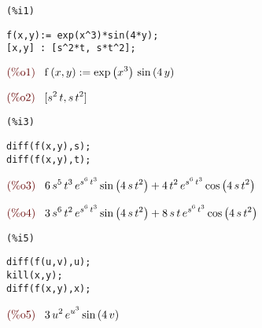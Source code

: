 \documentclass{article}
\begin{document}
\noindent
\begin{minipage}[t]{8ex}{\color{red}\bf
\begin{verbatim}
(%i1) 
\end{verbatim}}
\end{minipage}
\begin{minipage}[t]{\textwidth}{\color{blue}
\begin{verbatim}
f(x,y):= exp(x^3)*sin(4*y);
[x,y] : [s^2*t, s*t^2];
\end{verbatim}}
\end{minipage}
\begin{math}\displaystyle
\parbox{8ex}{\color{labelcolor}(\%o1) }
\mathrm{f}\left( x,y\right) :=\mathrm{exp}\left( {x}^{3}\right) \,\mathrm{sin}\left( 4\,y\right) 
\end{math}

\begin{math}\displaystyle
\parbox{8ex}{\color{labelcolor}(\%o2) }
[{s}^{2}\,t,s\,{t}^{2}]
\end{math}


\noindent
\begin{minipage}[t]{8ex}{\color{red}\bf
\begin{verbatim}
(%i3) 
\end{verbatim}}
\end{minipage}
\begin{minipage}[t]{\textwidth}{\color{blue}
\begin{verbatim}
diff(f(x,y),s);
diff(f(x,y),t);
\end{verbatim}}
\end{minipage}
\begin{math}\displaystyle
\parbox{8ex}{\color{labelcolor}(\%o3) }
6\,{s}^{5}\,{t}^{3}\,{e}^{{s}^{6}\,{t}^{3}}\,\mathrm{sin}\left( 4\,s\,{t}^{2}\right) +4\,{t}^{2}\,{e}^{{s}^{6}\,{t}^{3}}\,\mathrm{cos}\left( 4\,s\,{t}^{2}\right) 
\end{math}

\begin{math}\displaystyle
\parbox{8ex}{\color{labelcolor}(\%o4) }
3\,{s}^{6}\,{t}^{2}\,{e}^{{s}^{6}\,{t}^{3}}\,\mathrm{sin}\left( 4\,s\,{t}^{2}\right) +8\,s\,t\,{e}^{{s}^{6}\,{t}^{3}}\,\mathrm{cos}\left( 4\,s\,{t}^{2}\right) 
\end{math}


\noindent
\begin{minipage}[t]{8ex}{\color{red}\bf
\begin{verbatim}
(%i5) 
\end{verbatim}}
\end{minipage}
\begin{minipage}[t]{\textwidth}{\color{blue}
\begin{verbatim}
diff(f(u,v),u);
kill(x,y);
diff(f(x,y),x);
\end{verbatim}}
\end{minipage}
\begin{math}\displaystyle
\parbox{8ex}{\color{labelcolor}(\%o5) }
3\,{u}^{2}\,{e}^{{u}^{3}}\,\mathrm{sin}\left( 4\,v\right) 
\end{math}
\end{document}
